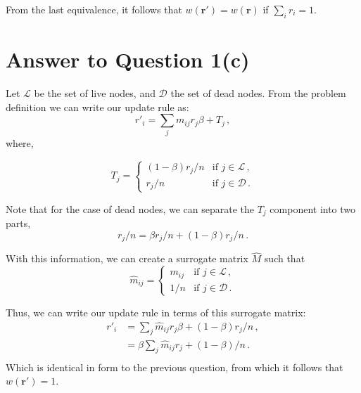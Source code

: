 \documentclass[11pt]{article}
\begin{document}
From the last equivalence, it follows that $w(\bm{r}') = w(\bm{r})$ if $ \sum_i r_i = 1$.

\pagebreak[4]
\section*{Answer to Question 1(c)}

Let $\mathcal{L}$ be the set of live nodes, and $\mathcal{D}$ the set of dead nodes. From the problem definition we can write our update rule as:
\begin{equation}
    r'_i = \sum_j m_{ij} r_j \beta + T_j \, ,
\end{equation}
where,

\begin{equation*}
    T_j = 
    \begin{cases}
    (1 - \beta) r_j / n & \text{if } j \in \mathcal{L} \, ,\\
    r_j / n & \text{if } j \in \mathcal{D} \, .
    \end{cases}
\end{equation*}

Note that for the case of dead nodes, we can separate the $T_j$ component into two parts,
\begin{equation}
    r_j / n = \beta r_j /n + (1 - \beta) r_j / n \,.
\end{equation}

With this information, we can create a surrogate matrix $\hat{M}$ such that
\begin{equation}
    \hat{m}_{ij} = 
    \begin{cases}
        m_{ij} & \text{if } j \in \mathcal{L} \, , \\
        1 /n & \text{if } j \in \mathcal{D} \, .
    \end{cases}
\end{equation}

Thus, we can write our update rule in terms of this surrogate matrix:
\begin{equation}
    \begin{split}
        r'_i  & = \sum_j \hat{m}_{ij} r_j \beta + (1 - \beta ) r_j /n \, , \\
        & = \beta \sum_j \hat{m}_{ij} r_j + (1 - \beta)  / n \, . \\
    \end{split}
\end{equation}
Which is identical in form to the previous question, from which it follows that $w(\bm{r}') = 1$.
\end{document}
